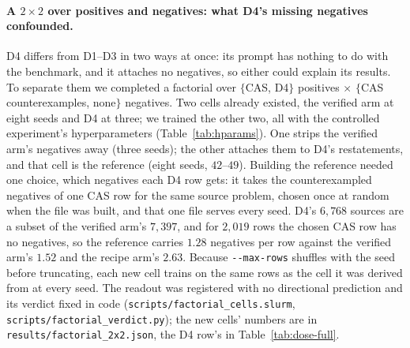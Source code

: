 \paragraph{A $2 \times 2$ over positives and negatives: what D4's missing negatives confounded.}
D4 differs from D1--D3 in two ways at once: its prompt has nothing to do with the benchmark, and it attaches no negatives, so either could explain its results. To separate them we completed a factorial over $\{$CAS, D4$\}$ positives $\times$ $\{$CAS counterexamples, none$\}$ negatives. Two cells already existed, the verified arm at eight seeds and D4 at three; we trained the other two, all with the controlled experiment's hyperparameters (Table~\ref{tab:hparams}). One strips the verified arm's negatives away (three seeds); the other attaches them to D4's restatements, and that cell is the reference (eight seeds, $42$--$49$). Building the reference needed one choice, which negatives each D4 row gets: it takes the counterexampled negatives of one CAS row for the same source problem, chosen once at random when the file was built, and that one file serves every seed. D4's $6{,}768$ sources are a subset of the verified arm's $7{,}397$, and for $2{,}019$ rows the chosen CAS row has no negatives, so the reference carries $1.28$ negatives per row against the verified arm's $1.52$ and the recipe arm's $2.63$. Because \verb|--max-rows| shuffles with the seed before truncating, each new cell trains on the same rows as the cell it was derived from at every seed. The readout was registered with no directional prediction and its verdict fixed in code (\texttt{scripts/factorial\_cells.slurm}, \texttt{scripts/factorial\_verdict.py}); the new cells' numbers are in \texttt{results/factorial\_2x2.json}, the D4 row's in Table~\ref{tab:dose-full}.

